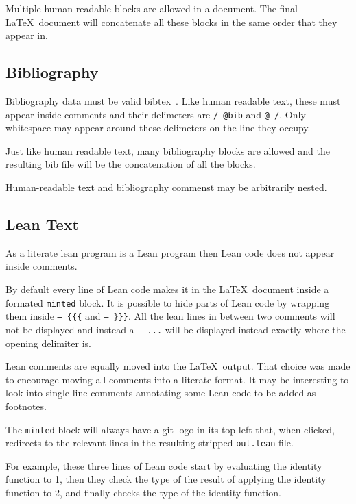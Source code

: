 Multiple human readable blocks are allowed in a document.
The final \LaTeX~document will concatenate all these blocks in the same order that they appear in.

\subsection{Bibliography}

Bibliography data must be valid bibtex~\cite{patashnik1984bibtex}.
Like human readable text, these must appear inside comments and their delimeters are \texttt{/-@bib} and \texttt{@-/}.
Only whitespace may appear around these delimeters on the line they occupy.


Just like human readable text, many bibliography blocks are allowed and the resulting bib file will be the concatenation of all the blocks.

Human-readable text and bibliography commenst may be arbitrarily nested.

\subsection{Lean Text}

As a literate lean program is a Lean program then Lean code does not appear inside comments.

By default every line of Lean code makes it in the \LaTeX~document inside a formated \texttt{minted} block.
It is possible to hide parts of Lean code by wrapping them inside \texttt{-- \{\{\{} and \texttt{-- \}\}\}}.
All the lean lines in between two comments will not be displayed and instead a \texttt{-- ...} will be displayed instead exactly where the opening delimiter is.

Lean comments are equally moved into the \LaTeX~output.
That choice was made to encourage moving all comments into a literate format.
It may be interesting to look into single line comments annotating some Lean code to be added as footnotes.

The \texttt{minted} block will always have a git logo in its top left that, when clicked, redirects to the relevant lines in the resulting stripped \texttt{out.lean} file.

For example, these three lines of Lean code start by evaluating the identity function to 1,
then they check the type of the result of applying the identity function to 2, and finally
checks the type of the identity function.

